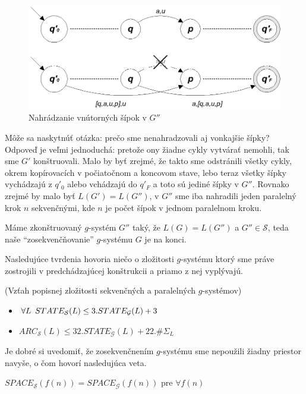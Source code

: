 \begin{dokaz}
\begin{enumerate}
  \begin{figure}[!ht]
    \centering
    \includegraphics{img/gsystems/g_s_p_2}
    \caption{Nahrádzanie vnútorných šípok v $G''$} \label{gs_obr_gps2}
  \end{figure}

  Môže sa naskytnúť otázka: prečo sme nenahradzovali aj vonkajšie
  šípky? Odpoveď je veľmi jednoduchá: pretože ony žiadne cykly
  vytvárať nemohli, tak sme $G'$ konštruovali. Malo by byť zrejmé,
  že takto sme odstránili všetky cykly, okrem kopírovacích v
  počiatočnom a koncovom stave, lebo teraz všetky šípky vychádzajú z
  $q'_0$ alebo vchádzajú do $q'_F$ a toto sú jediné šípky v $G''$.
  Rovnako zrejmé by malo byť $L(G')=L(G'')$, v $G''$ sme iba
  nahradili jeden paralelný krok $n$ sekvenčnými, kde $n$ je počet
  šípok v jednom paralelnom kroku.
\end{enumerate}
Máme zkonštruovaný $g$-systém $G''$ taký, že $L(G)=L(G'')$ a
$G''\in\mathcal{S}$, teda naše ``zosekvenčňovanie'' $g$-systému
$G$ je na konci.
\end{dokaz}

Nasledujúce tvrdenia hovoria niečo o zložitosti $g$-systému ktorý
sme práve zostrojili v pred\-chá\-dza\-jú\-cej konštrukcii a
priamo z nej vyplývajú.

\begin{veta}
(Vzťah popisnej zložitosti sekvenčných a paralelných $g$-systémov)
\begin{itemize}
  \item $\forall L\enspace STATE_{\mathcal{S}}(L)\leq
  3.STATE_{\mathcal{G}}(L)+3$
  \item $ARC_{\mathcal{S}}(L)\leq 32.STATE_{\mathcal{G}}(L)+22.\#\Sigma_L$
\end{itemize}
\end{veta}

Je dobré si uvedomiť, že zosekvenčnením $g$-systému sme nepoužili
žiadny priestor navyše, o čom hovorí nasledujúca veta.

\begin{veta}
$SPACE_{\mathcal{S}}(f(n))=SPACE_{\mathcal{G}}(f(n))$ pre $\forall
f(n)$
\end{veta}

